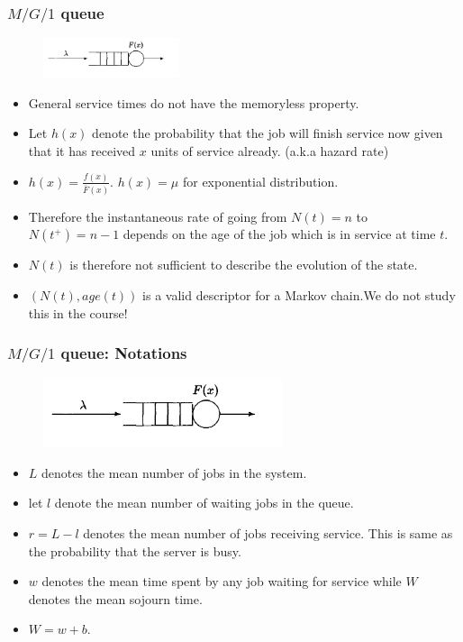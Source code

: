 \documentclass{beamer}
\def \mp {\pause}
\def \mp {}
\newcommand{\ft}[1]{\frametitle{#1}}
\begin{document}
\begin{frame}
 \ft{$M/G/1$ queue}
\begin{figure}
\includegraphics[width=4cm]{mgone}
\centering
\end{figure}
\begin{itemize}\setlength\itemsep{.6em}
\mp\item General service times do not have the memoryless property.
\mp \item Let $h(x)$ denote the probability that the job will finish service now given that it has received $x$ units of service already. \mp (a.k.a hazard rate)
\mp \item $h(x) = \frac{f(x)}{\bar{F}(x)}$. \mp $h(x) = \mu$ for exponential distribution.
\mp\item Therefore the instantaneous rate of going from $N(t) = n$ to $N(t^+) = n-1$ depends on the age of the job which is in service at time $t$.
\mp \item  $N(t)$ is therefore not sufficient to describe the evolution of the state.
\mp\item $(N(t), age(t))$ is a valid descriptor for a Markov chain.\mp We do not study this in the course!
\end{itemize}
\end{frame}










\begin{frame}
 \ft{$M/G/1$ queue: Notations}
\begin{figure}
\includegraphics[width=7cm]{mgone}
\centering
\end{figure}
\begin{itemize}\setlength\itemsep{.8em}
\mp \item $L$ denotes the mean number of jobs in the system.
\mp  \item let $l$ denote the mean number of waiting jobs in the queue.
\mp \item $r = L - l$ denotes the mean number of jobs receiving service. \mp This is same as the probability that the server is busy.
\mp \item $w$ denotes the mean time spent by any job waiting for service while $W$ denotes the mean sojourn time.
\mp \item $W = w + b.$
\end{itemize}
\end{frame}
\end{document}
